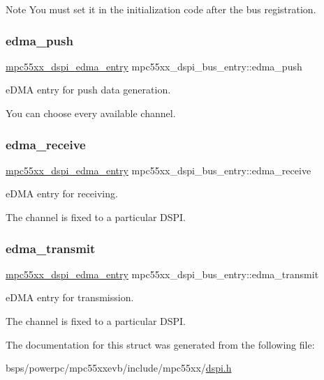 \begin{DoxyNote}{Note}
You must set it in the initialization code after the bus registration. 
\end{DoxyNote}
\mbox{\label{structmpc55xx__dspi__bus__entry_ac263d52ae23b05e92f846a45c496cb67}} 
\subsubsection{\texorpdfstring{edma\_push}{edma\_push}}
{\footnotesize\ttfamily \mbox{\hyperlink{structmpc55xx__dspi__edma__entry}{mpc55xx\+\_\+dspi\+\_\+edma\+\_\+entry}} mpc55xx\+\_\+dspi\+\_\+bus\+\_\+entry\+::edma\+\_\+push}



e\+D\+MA entry for push data generation. 

You can choose every available channel. \mbox{\label{structmpc55xx__dspi__bus__entry_abc95efcd6fa4691a4fb7e39efc5fcc70}} 
\subsubsection{\texorpdfstring{edma\_receive}{edma\_receive}}
{\footnotesize\ttfamily \mbox{\hyperlink{structmpc55xx__dspi__edma__entry}{mpc55xx\+\_\+dspi\+\_\+edma\+\_\+entry}} mpc55xx\+\_\+dspi\+\_\+bus\+\_\+entry\+::edma\+\_\+receive}



e\+D\+MA entry for receiving. 

The channel is fixed to a particular D\+S\+PI. \mbox{\label{structmpc55xx__dspi__bus__entry_aac9a5d787e7586cc4590db83948fb61a}} 
\subsubsection{\texorpdfstring{edma\_transmit}{edma\_transmit}}
{\footnotesize\ttfamily \mbox{\hyperlink{structmpc55xx__dspi__edma__entry}{mpc55xx\+\_\+dspi\+\_\+edma\+\_\+entry}} mpc55xx\+\_\+dspi\+\_\+bus\+\_\+entry\+::edma\+\_\+transmit}



e\+D\+MA entry for transmission. 

The channel is fixed to a particular D\+S\+PI. 

The documentation for this struct was generated from the following file\+:\begin{DoxyCompactItemize}
\item 
bsps/powerpc/mpc55xxevb/include/mpc55xx/\mbox{\hyperlink{dspi_8h}{dspi.\+h}}\end{DoxyCompactItemize}
